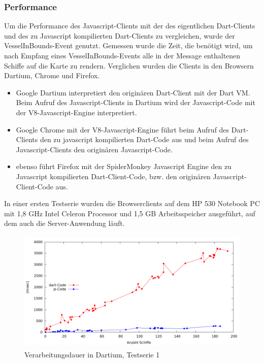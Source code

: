 \subsubsection{Performance}
Um die Performance des Javascript-Clients mit der des eigentlichen Dart-Clients und des zu Javascript kompilierten Dart-Clients zu vergleichen, wurde der VesselInBounds-Event genutzt. Gemessen wurde die Zeit, die benötigt wird, um nach Empfang eines VesselInBounds-Events alle in der Message enthaltenen Schiffe auf die Karte zu rendern. Verglichen wurden die Clients in den Browsern Dartium, Chrome und Firefox.
\begin{itemize}
\item Google Dartium interpretiert den originären Dart-Client mit der Dart VM. Beim Aufruf des Javascript-Clients in Dartium wird der Javascript-Code mit der V8-Javascript-Engine interpretiert.
\item Google Chrome  mit der V8-Javascript-Engine führt beim Aufruf des Dart-Clients den zu javascript kompilierten Dart-Code aus und beim Aufruf des Javascript-Clients den originären Javascript-Code.
\item ebenso führt Firefox mit der SpiderMonkey Javascript Engine den zu Javascript kompilierten Dart-Client-Code, bzw. den originären Javascript-Client-Code aus.
\end {itemize}
\newpage
In einer ersten Testserie wurden die Browserclients auf dem HP 530 Notebook PC mit 1,8 GHz Intel Celeron Processor und 1,5 GB Arbeitsspeicher ausgeführt, auf dem auch die Server-Anwendung läuft.

\begin {figure}[H]
\begin{center}
  \includegraphics[height=2.3in]{images/Dartium.png}
\end{center}
 \caption{Verarbeitungsdauer in Dartium, Testserie 1}
\end {figure}


